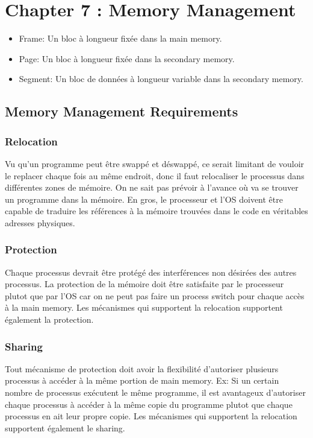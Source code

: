 \section{Chapter 7 : Memory Management}
\begin{itemize}
  \item Frame: Un bloc à longueur fixée dans la main memory.
  \item Page: Un bloc à longueur fixée dans la secondary memory.
  \item Segment: Un bloc de données à longueur variable dans la secondary memory.
\end{itemize}

\subsection{Memory Management Requirements}
\subsubsection{Relocation}
Vu qu'un programme peut être swappé et déswappé, ce serait limitant de vouloir le replacer chaque fois au même endroit,
donc il faut relocaliser le processus dans différentes zones de mémoire.
On ne sait pas prévoir à l'avance où va se trouver un programme dans la mémoire.
En gros, le processeur et l'OS doivent être capable de traduire les références à la mémoire trouvées dans le code en véritables adresses physiques.

\subsubsection{Protection}
Chaque processus devrait être protégé des interférences non désirées des autres processus.
La protection de la mémoire doit être satisfaite par le processeur plutot que par l'OS
car on ne peut pas faire un process switch pour chaque accès à la main memory.
Les mécanismes qui supportent la relocation supportent également la protection.

\subsubsection{Sharing}
Tout mécanisme de protection doit avoir la flexibilité d'autoriser plusieurs processus à accéder à la même portion de main memory.
Ex: Si un certain nombre de processus exécutent le même programme,
il est avantageux d'autoriser chaque processus à accéder à la même copie du programme plutot que chaque processus en ait leur propre copie.
Les mécanismes qui supportent la relocation supportent également le sharing.


